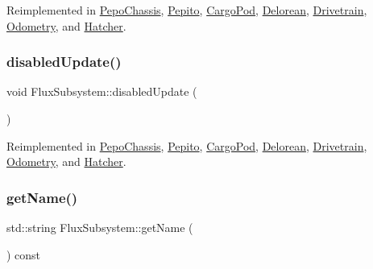 Reimplemented in \hyperlink{classPepoChassis_af5f6848de51ac4c47cbf2f9f706b1485}{Pepo\+Chassis}, \hyperlink{classPepito_a04a85eae33c653f9555b6db43d50b210}{Pepito}, \hyperlink{classCargoPod_a924ef514ed33ea4e7f7ef966f5b83fa7}{Cargo\+Pod}, \hyperlink{classDelorean_ae054ba79b38b46d20e50becb5d31884c}{Delorean}, \hyperlink{classDrivetrain_ac6fe041de609bdb45eac65282fbdf507}{Drivetrain}, \hyperlink{classOdometry_a0df3b0180a8fa5a01a9e441de112140e}{Odometry}, and \hyperlink{classHatcher_a2e61639f734ec3a5627b655695bbadf1}{Hatcher}.

\mbox{\label{classFluxSubsystem_a5c39cb0f0834cc77a2b8f4f47778da87}} 
\subsubsection{\texorpdfstring{disabled\+Update()}{disabledUpdate()}}
{\footnotesize\ttfamily void Flux\+Subsystem\+::disabled\+Update (\begin{DoxyParamCaption}{ }\end{DoxyParamCaption})\hspace{0.3cm}{\ttfamily [virtual]}}



Reimplemented in \hyperlink{classPepoChassis_a33af04df9c2396d6197f3298172763d9}{Pepo\+Chassis}, \hyperlink{classPepito_afc29a2b7ac94a47381ca213dc2993c39}{Pepito}, \hyperlink{classCargoPod_a71b58a975ba9f20f4a9023aa3fcbba0e}{Cargo\+Pod}, \hyperlink{classDelorean_acc8f7d93dd894233d16f34316d363983}{Delorean}, \hyperlink{classDrivetrain_a46aa479a25757868bfda71081ec7baa2}{Drivetrain}, \hyperlink{classOdometry_aef83c6c62c8e992b20759aec705c2ee8}{Odometry}, and \hyperlink{classHatcher_ab6bb222ab940507490f2009f3113bc41}{Hatcher}.

\mbox{\label{classFluxSubsystem_a661009e388711cd134d519160d1633ac}} 
\subsubsection{\texorpdfstring{get\+Name()}{getName()}}
{\footnotesize\ttfamily std\+::string Flux\+Subsystem\+::get\+Name (\begin{DoxyParamCaption}{ }\end{DoxyParamCaption}) const}

